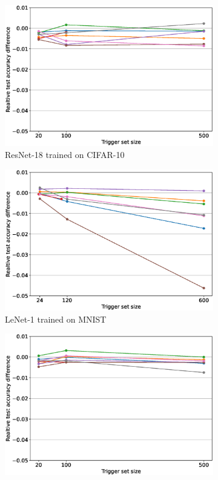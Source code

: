 \begin{figure}
\begin{subfigure}{0.4\linewidth}
        \includegraphics[width=\linewidth]{images/fidelity/resnet18_fidelity_rel_per_arch.eps}
        \caption{ResNet-18 trained on CIFAR-10}
        \label{fig:fidelity-resnet18}
    \end{subfigure}
    \quad
    \begin{subfigure}{0.4\linewidth}
        \includegraphics[width=\linewidth]{images/fidelity/lenet1_fidelity_rel_per_arch.eps}
        \caption{LeNet-1 trained on MNIST}
        \label{fig:fidelity-lenet1}
    \end{subfigure}
    \quad
    \begin{subfigure}{0.4\linewidth}
        \includegraphics[width=\linewidth]{images/fidelity/resnet34_fidelity_rel_per_arch.eps}

\end{subfigure}
\end{figure}
